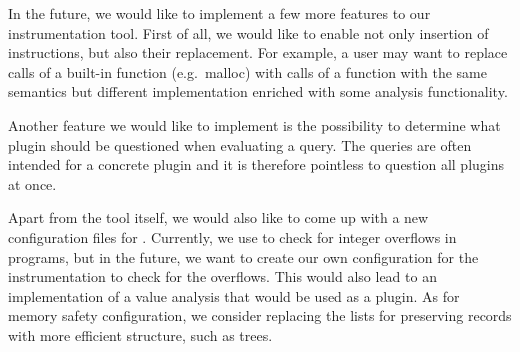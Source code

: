 In the future, we would like to implement a few more features to our
instrumentation tool. First of all, we would like to enable not only insertion
of instructions, but also their replacement. For example, a user may want to
replace calls of a built-in function (e.g.~malloc) with calls of a function
with the same semantics but different implementation enriched with some
analysis functionality.

Another feature we would like to implement is the possibility to determine
what plugin should be questioned when evaluating a query. The queries are often
intended for a concrete plugin and it is therefore pointless to question all
plugins at once.

Apart from the tool itself, we would also like to come up with a new
configuration files for \symbiotic. Currently, we use \clang to check for
integer overflows in programs, but in the future, we want to create our own
configuration for the instrumentation to check for the overflows. This would
also lead to an implementation of a value analysis that would be used as a plugin.
As for memory safety configuration, we consider replacing the lists for
preserving records with more efficient structure, such as trees.
